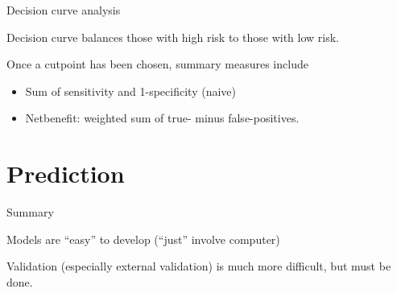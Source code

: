 \documentclass[10pt,ignorenonframetext,]{beamer}
\providecommand{\tightlist}{%
\setlength{\itemsep}{0pt}\setlength{\parskip}{0pt}}
\begin{document}
\begin{frame}{Decision curve analysis}

Decision curve balances those with high risk to those with low risk.

Once a cutpoint has been chosen, summary measures include

\begin{itemize}[<+->]
\tightlist
\item
  Sum of sensitivity and 1-specificity (naive)
\item
  Netbenefit: weighted sum of true- minus false-positives.
\end{itemize}

\end{frame}

\section{Prediction}\label{prediction-1}

\begin{frame}{Summary}

Models are ``easy'' to develop (``just'' involve computer)

Validation (especially external validation) is much more difficult, but
must be done.

\end{frame}
\end{document}
